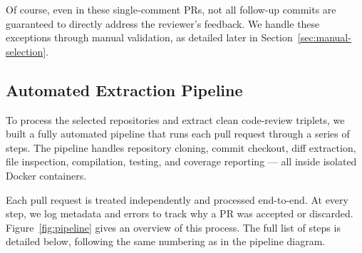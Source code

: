 Of course, even in these single-comment PRs, not all follow-up commits are guaranteed to directly
address the reviewer’s feedback. We handle these exceptions through manual validation, as detailed
later in Section~\ref{sec:manual-selection}.

\subsection{Automated Extraction Pipeline}

To process the selected repositories and extract clean code-review triplets, we built a fully
automated pipeline that runs each pull request through a series of steps. The pipeline handles
repository cloning, commit checkout, diff extraction, file inspection, compilation, testing, and
coverage reporting — all inside isolated Docker containers.

Each pull request is treated independently and processed end-to-end. At every step, we log metadata
and errors to track why a PR was accepted or discarded. Figure~\ref{fig:pipeline} gives an overview
of this process. The full list of steps is detailed below, following the same numbering as in the
pipeline diagram.


